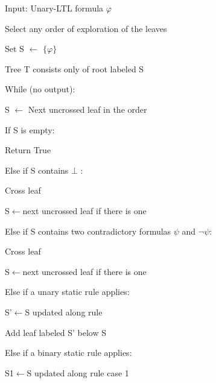 \documentclass[11pt]{article}
\newcommand{\phii}{{\varphi}}
\theoremstyle{definition}
\begin{document}
{\tt 

Input: Unary-LTL formula $\phii$

Select any order of exploration of the leaves

Set S $\gets$ $\{\phii\}$

Tree T consists only of root labeled S

While (no output):

\hspace*{1cm} S $\gets$ Next uncrossed leaf in the order

\hspace*{1cm}   If S is empty:

\hspace*{1cm}\hspace*{1cm}    Return True

\hspace*{1cm}    Else if S contains $\bot$ :
    
\hspace*{1cm}\hspace*{1cm}        Cross leaf
        
\hspace*{1cm}\hspace*{1cm}       S$\gets$next uncrossed leaf if there is one

\hspace*{1cm}    Else if S contains two contradictory formulas $\psi$ and $\neg\psi$:

\hspace*{1cm}\hspace*{1cm}      Cross leaf
        
\hspace*{1cm}\hspace*{1cm}      S$\gets$next uncrossed leaf if there is one

\hspace*{1cm}    Else if a unary static rule applies:

\hspace*{1cm}\hspace*{1cm}      S'$\gets$S updated along rule

\hspace*{1cm}\hspace*{1cm}       Add leaf labeled S' below S

\hspace*{1cm}    Else if a binary static rule applies:

\hspace*{1cm}\hspace*{1cm}       S1$\gets$S updated along rule case 1

}
\end{document}

